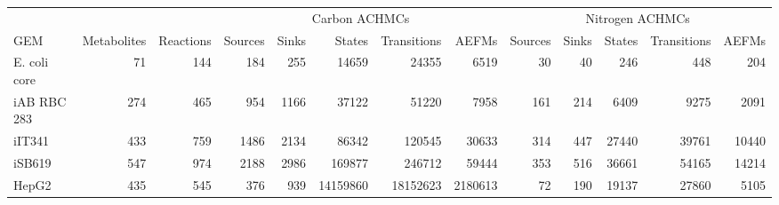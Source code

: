 \begin{tabular}{l rr rrrrr rrrrr}
	\toprule
	& & & \multicolumn{5}{c}{Carbon ACHMCs} & \multicolumn{5}{c}{Nitrogen ACHMCs}\\
	\cmidrule(lr){4-8} \cmidrule(lr){9-13}
	GEM & Metabolites & Reactions & Sources & Sinks & States & Transitions & AEFMs & Sources & Sinks & States & Transitions & AEFMs\\
	\midrule
	E. coli core & 71 & 144 & 184 & 255 & 14659 & 24355 & 6519 & 30 & 40 & 246 & 448 & 204\\
	iAB RBC 283 & 274 & 465 & 954 & 1166 & 37122 & 51220 & 7958 & 161 & 214 & 6409 & 9275 & 2091\\
	iIT341 & 433 & 759 & 1486 & 2134 & 86342 & 120545 & 30633 & 314 & 447 & 27440 & 39761 & 10440\\
	iSB619 & 547 & 974 & 2188 & 2986 & 169877 & 246712 & 59444 & 353 & 516 & 36661 & 54165 & 14214\\
	HepG2 & 435 & 545 & 376 & 939 & 14159860 & 18152623 & 2180613 & 72 & 190 & 19137 & 27860 & 5105\\
	\bottomrule
\end{tabular}
